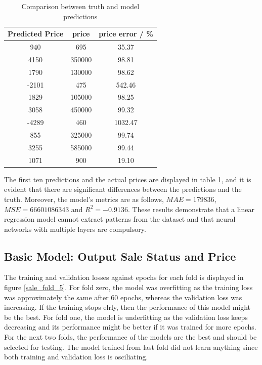 \documentclass[12pt,twoside]{report}
\begin{document}
\begin{table}[h]
	\centering
	\caption{Comparison between truth and model predictions}
	\label{linear_regression_predictions}
	\begin{tabular}{| c | c | c |}
		\hline
		Predicted Price & price & price error  / \%\\ 
		\hline
		940 & 695 & 35.37 \\
		\hline
		4150 & 350000 & 98.81 \\
		\hline
		1790 & 130000 & 98.62 \\
		\hline
		-2101 & 475 & 542.46 \\
		\hline
		1829 & 105000 & 98.25 \\
		\hline
		3058 & 450000 & 99.32 \\
		\hline
		-4289 & 460 & 1032.47 \\
		\hline
		855 & 325000 & 99.74 \\
		\hline
		3255 & 585000 & 99.44 \\
		\hline
		1071 & 900 & 19.10 \\
		\hline
	\end{tabular}
\end{table}

The first ten predictions and the actual prices are displayed in table \ref{linear_regression_predictions}, and it is evident that there are significant differences between the predictions and the truth. Moreover, the model's metrics are as follows, $MAE = 179836$, $MSE = 66601086343$ and $R^2 = -0.9136$. These results demonstrate that a linear regression model cannot extract patterns from the dataset and that neural networks with multiple layers are compulsory.

\subsection{Basic Model: Output Sale Status and Price}
The training and validation losses against epochs for each fold is displayed in figure \ref{sale_fold_5}. For fold zero, the model was overfitting as the training loss was approximately the same after 60 epochs, whereas the validation loss was increasing. If the training stops elrly, then the performance of this model might be the best. For fold one, the model is underfitting as the validation loss keeps decreasing and its performance might be better if it was trained for more epochs. For the next two folds, the performance of the models are the best and should be selected for testing. The model trained from last fold did not learn anything since both training and validation loss is osciliating. 
\\
\end{document}
